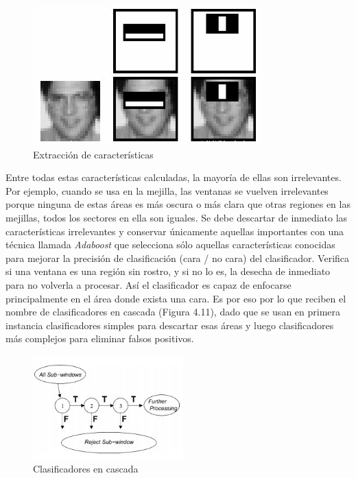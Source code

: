 \begin{figure}[H]
  \begin{center}
    \includegraphics[width=0.69\linewidth]{figures/extraction.jpg}
		\caption{Extracción de características}
		\label{fig.extraction}
		\end{center}
\end{figure}

Entre todas estas características calculadas, la mayoría de ellas son irrelevantes. Por ejemplo, cuando se usa en la mejilla, las ventanas se vuelven irrelevantes porque ninguna de estas áreas es más oscura o más clara que otras regiones en las mejillas, todos los sectores en ella son iguales. Se debe descartar de inmediato las características irrelevantes y conservar únicamente aquellas importantes con una técnica llamada \textit{Adaboost} que selecciona sólo aquellas características conocidas para mejorar la precisión de clasificación (cara / no cara) del clasificador. Verifica si una ventana es una región sin rostro, y si no lo es, la desecha de inmediato para no volverla a procesar. Así el clasificador es capaz de enfocarse principalmente en el área donde exista una cara. Es por eso por lo que reciben el nombre de clasificadores en cascada (Figura 4.11), dado que se usan en primera instancia clasificadores simples para descartar esas áreas y luego clasificadores más complejos para eliminar falsos positivos.

\begin{figure}[H]
  \begin{center}
    \includegraphics[width=0.50\linewidth, height=4cm]{figures/cascade.jpg}
		\caption{Clasificadores en cascada}
		\label{fig.cascade}
		\end{center}
\end{figure}

